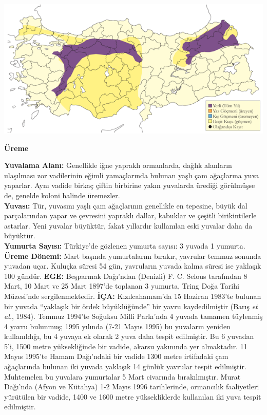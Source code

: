 \documentclass[
  a4paper,
  DIV=11,
  numbers=noendperiod]{scrreprt}
\begin{document}
\includegraphics{images/harita_Page_088.png}

\textbf{Üreme}

\textbf{Yuvalama Alanı:} Genellikle iğne yapraklı ormanlarda, dağlık
alanların ulaşılması zor vadilerinin eğimli yamaçlarında bulunan yaşlı
çam ağaçlarına yuva yaparlar. Aynı vadide birkaç çiftin birbirine yakın
yuvalarda ürediği görülmüşse de, genelde koloni halinde üremezler.\\
\textbf{Yuvası:} Tür, yuvasını yaşlı çam ağaçlarının genellikle en
tepesine, büyük dal parçalarından yapar ve çevresini yapraklı dallar,
kabuklar ve çeşitli birikintilerle astarlar. Yeni yuvalar büyüktür,
fakat yıllardır kullanılan eski yuvalar daha da büyüktür.\\
\textbf{Yumurta Sayısı:} Türkiye'de gözlenen yumurta sayısı: 3 yuvada 1
yumurta.\\
\textbf{Üreme Dönemi:} Mart başında yumurtalarını bırakır, yavrular
temmuz sonunda yuvadan uçar. Kuluçka süresi 54 gün, yavruların yuvada
kalma süresi ise yaklaşık 100 gündür. \textbf{EGE:} Beşparmak Dağı'ndan
(Denizli) F. C. Selous tarafından 8 Mart, 10 Mart ve 25 Mart 1897'de
toplanan 3 yumurta, Tring Doğa Tarihi Müzesi'nde sergilenmektedir.
\textbf{İÇA:} Kızılcahamam'da 15 Haziran 1983'te bulunan bir yuvada
``yaklaşık bir ördek büyüklüğünde'' bir yavru kaydedilmiştir (Barış
\emph{et al.}, 1984). Temmuz 1994'te Soğuksu Milli Parkı'nda 4 yuvada
tamamen tüylenmiş 4 yavru bulunmuş; 1995 yılında (7-21 Mayıs 1995) bu
yuvaların yeniden kullanıldığı, bu 4 yuvaya ek olarak 2 yuva daha tespit
edilmiştir. Bu 6 yuvadan 5'i, 1500 metre yüksekliğinde bir vadide,
akarsu yakınında yer almaktadır. 11 Mayıs 1995'te Hamam Dağı'ndaki bir
vadide 1300 metre irtifadaki çam ağaçlarında bulunan iki yuvada yaklaşık
14 günlük yavrular tespit edilmiştir. Muhtemelen bu yuvalara yumurtalar
5 Mart civarında bırakılmıştır. Murat Dağı'nda (Afyon ve Kütahya) 1-2
Mayıs 1996 tarihlerinde, ormancılık faaliyetleri yürütülen bir vadide,
1400 ve 1600 metre yüksekliklerde kullanılan iki yuva tespit edilmiştir.
\end{document}
